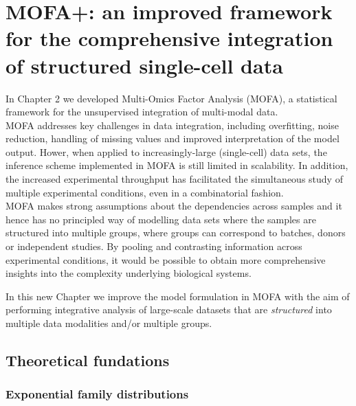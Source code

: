 \graphicspath{{Chapter4/Figs/simulations/}{Chapter4/Figs/scrna/}{Chapter4/Figs/scmet/}{Chapter4/Figs/scnmt/}}

\chapter{MOFA+: an improved framework for the comprehensive integration of structured single-cell data}

In Chapter 2 we developed Multi-Omics Factor Analysis (MOFA), a statistical framework for the unsupervised integration of multi-modal data. \\
MOFA addresses key challenges in data integration, including overfitting, noise reduction, handling of missing values and improved interpretation of the model output. Hower, when applied to increasingly-large (single-cell) data sets, the inference scheme implemented in MOFA is still limited in scalability. In addition, the increased experimental throughput has facilitated the simultaneous study of multiple experimental conditions, even in a combinatorial fashion\cite{Replogle2020}.\\
MOFA makes strong assumptions about the dependencies across samples and it hence has no principled way of modelling data sets where the samples are structured into multiple groups, where groups can correspond to batches, donors or independent studies. By pooling and contrasting information across experimental conditions, it would be possible to obtain more comprehensive insights into the complexity underlying biological systems.

In this new Chapter we improve the model formulation in MOFA with the aim of performing integrative analysis of large-scale datasets that are \textit{structured} into multiple data modalities and/or multiple groups.


\section{Theoretical fundations}

\subsection{Exponential family distributions} \label{section:exponential_family}

